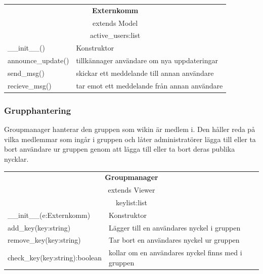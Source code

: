 \begin{tabular}{|l|p{10 cm}|}
\hline
\multicolumn{2}{|c|}{\textbf{Externkomm}} \\
\multicolumn{2}{|c|}{extends Model} \\
\hline
\multicolumn{2}{|c|}{active\_users:list} \\
\hline
\_\_init\_\_() &Konstruktor\\
announce\_update()& tillkännager användare om nya uppdateringar\\
send\_msg() & skickar ett meddelande till annan användare\\
recieve\_msg() & tar emot ett meddelande från annan användare\\
\hline

\end{tabular}

\subsubsection{Grupphantering}
Groupmanager hanterar den gruppen som wikin är medlem i. Den håller reda på vilka medlemmar som ingår i gruppen och låter administratörer lägga till eller ta bort användare ur gruppen genom att lägga till eller ta bort deras publika nycklar.

\begin{tabular}{|l|p{10 cm}|}
\hline
\multicolumn{2}{|c|}{\textbf{Groupmanager}} \\
\multicolumn{2}{|c|}{extends Viewer} \\
\hline
\multicolumn{2}{|c|}{keylist:list} \\
\hline
\_\_init\_\_(e:Externkomm) &Konstruktor\\
add\_key(key:string)& Lägger till en användares nyckel i gruppen\\
remove\_key(key:string)& Tar bort en användares nyckel ur gruppen\\
check\_key(key:string):boolean& kollar om en användares nyckel finns med i gruppen\\
\hline

\end{tabular}

